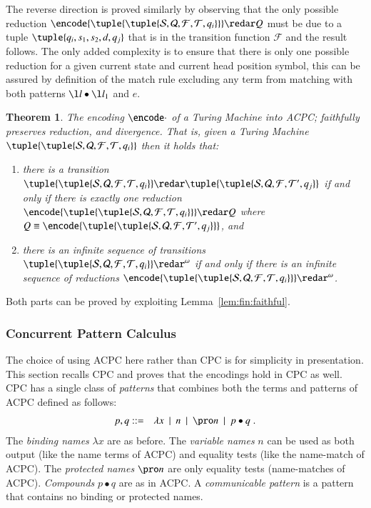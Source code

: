 \documentclass[submission,copyright,creativecommons]{eptcs}
\def\BNF{\ \  | \ \  }
\newtheorem{theorem}{Theorem}[section]
\newenvironment{proof}[1][Proof]{\begin{trivlist}
\item[\hskip \labelsep {\bfseries #1}]}{\end{trivlist}}
\newcommand{\tmach}[1]{\tuple{\tuple{#1}}}
\begin{document}
\begin{proof}
The reverse direction is proved similarly by observing that the only possible reduction
$\encode{\tmach{{\mathcal S}, {\mathcal Q}, {\mathcal F}, {\mathcal T}, q_i}}\redar Q$
must be due to a tuple $\tuple{q_i,s_1,s_2,d,q_j}$ that is in the transition function ${\mathcal F}$
and the result follows. The only added complexity is to ensure that there is only one possible
reduction for a given current state and current head position symbol, this can be assured by
definition of the match rule excluding any term from matching with both patterns
$\enclist{\l l_1\bullet \l l}{\l l\bullet \l l_1}$ and $e$.
\end{proof}

\begin{theorem}
\label{thm:fin:done}
The encoding $\encode\cdot$ of a Turing Machine into ACPC; faithfully preserves reduction, and
divergence.
That is, given a Turing Machine $\tmach{{\mathcal S}, {\mathcal Q}, {\mathcal F}, {\mathcal T}, q_i}$
then it holds that:
\begin{enumerate}
\item there is a transition
$\tmach{{\mathcal S}, {\mathcal Q}, {\mathcal F}, {\mathcal T}, q_i}\redar
\tmach{{\mathcal S}, {\mathcal Q}, {\mathcal F}, {\mathcal T}', q_j}$
if and only if there is exactly one reduction
$\encode{\tmach{{\mathcal S}, {\mathcal Q}, {\mathcal F}, {\mathcal T}, q_i}}\redar Q$
where $Q\equiv\encode{\tmach{{\mathcal S}, {\mathcal Q}, {\mathcal F}, {\mathcal T}', q_j}}$, and
\item there is an infinite sequence of transitions
$\tmach{{\mathcal S}, {\mathcal Q}, {\mathcal F}, {\mathcal T}, q_i}\redar^\omega$
if and only if there is an infinite sequence of reductions
$\encode{\tmach{{\mathcal S}, {\mathcal Q}, {\mathcal F}, {\mathcal T}, q_i}}\redar^\omega$.
\end{enumerate}
\end{theorem}
\begin{proof}
Both parts can be proved by exploiting Lemma~\ref{lem:fin:faithful}.
\end{proof}


\subsubsection*{Concurrent Pattern Calculus}
\label{ssec:cpc}


The choice of using ACPC here rather than CPC is for simplicity in presentation.
This section recalls CPC and proves that the encodings hold in CPC as well.
CPC has a single class of {\em patterns} that combines both the terms and patterns of
ACPC defined as follows:
\begin{eqnarray*}
p,q &::=& \lambda x \BNF n \BNF \pro n\BNF p\bullet q\; .
\end{eqnarray*}
The {\em binding names} $\lambda x$ are as before.
The {\em variable names} $n$ can be used as both output (like the name terms
of ACPC) and equality tests (like the name-match of ACPC).
The {\em protected names} $\pro n$ are only equality tests (name-matches of ACPC).
{\em Compounds} $p\bullet q$ are as in ACPC.
A {\em communicable pattern} is a pattern that contains no binding or protected names.
\newcommand{\cpcmatch}[2]{\{ #1\pmatch #2\}}
\end{document}
